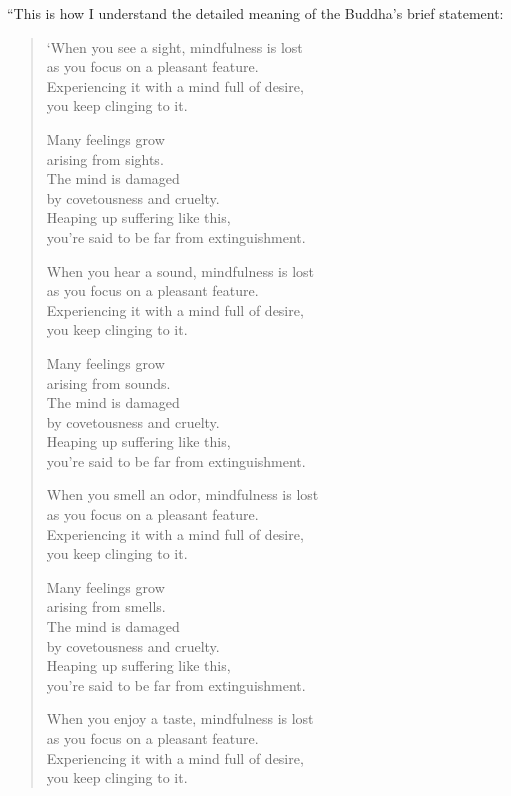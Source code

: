 \documentclass[12pt,openany]{book}%
\begin{document}
“This is how I understand the detailed meaning of the Buddha’s brief statement: 

\begin{verse}%
‘When you see a sight, mindfulness is lost \\
as you focus on a pleasant feature. \\
Experiencing it with a mind full of desire, \\
you keep clinging to it. 

Many feelings grow \\
arising from sights. \\
The mind is damaged \\
by covetousness and cruelty. \\
Heaping up suffering like this, \\
you’re said to be far from extinguishment. 

When you hear a sound, mindfulness is lost \\
as you focus on a pleasant feature. \\
Experiencing it with a mind full of desire, \\
you keep clinging to it. 

Many feelings grow \\
arising from sounds. \\
The mind is damaged \\
by covetousness and cruelty. \\
Heaping up suffering like this, \\
you’re said to be far from extinguishment. 

When you smell an odor, mindfulness is lost \\
as you focus on a pleasant feature. \\
Experiencing it with a mind full of desire, \\
you keep clinging to it. 

Many feelings grow \\
arising from smells. \\
The mind is damaged \\
by covetousness and cruelty. \\
Heaping up suffering like this, \\
you’re said to be far from extinguishment. 

When you enjoy a taste, mindfulness is lost \\
as you focus on a pleasant feature. \\
Experiencing it with a mind full of desire, \\
you keep clinging to it. 


\end{verse}
\end{document}
